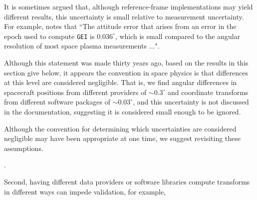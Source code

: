 \documentclass[draft]{agujournal2019}
\begin{document}

It is sometimes argued that, although reference-frame implementations may yield different results, this uncertainty is small relative to measurement uncertainty. For example,  notes that ``The attitude error that arises from an error in the epoch used to compute \texttt{GEI} is $0.036^\circ$, which is small compared to the angular resolution of most space plasma measurements ...". 

Although this statement was made thirty years ago, based on the results in this section give below, it appears the convention in space physics is that differences at this level are considered negligible. That is, we find angular differences in spacecraft positions from different providers of ${\sim}0.3^\circ$ and coordinate transforms from different software packages of ${\sim} 0.03^\circ$, and this uncertainty is not discussed in the documentation, suggesting it is considered small enough to be ignored.

Although the convention for determining which uncertainties are considered negligible may have been appropriate at one time, we suggest revisiting these assumptions.  

.

Second, having different data providers or software libraries compute transforms in different ways can impede validation, for example, 

\end{document}
